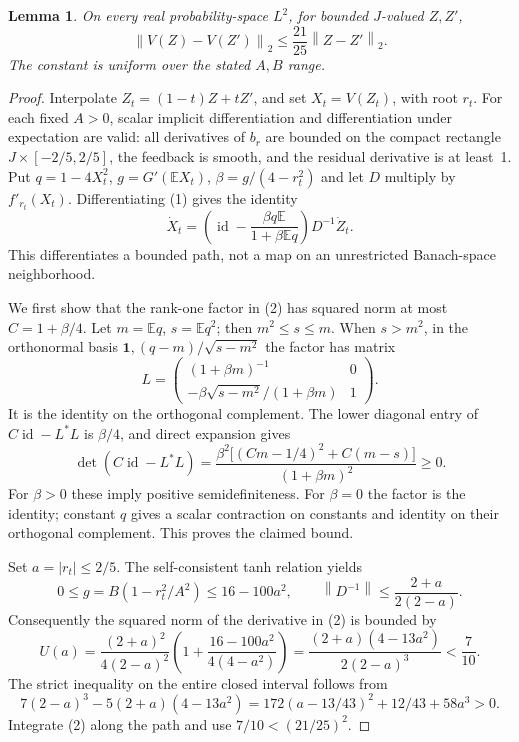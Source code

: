 \documentclass[11pt]{article}
\newtheorem{lemma}[theorem]{Lemma}
\newcommand{\E}{\mathbb E}
\newcommand{\norm}[1]{\left\lVert#1\right\rVert}
\newcommand{\one}{\mathbf 1}
\DeclareMathOperator{\id}{id}
\begin{document}
\begin{lemma}\label{lem:contract}
On every real probability-space $L^2$, for bounded $J$-valued $Z,Z'$,
\[
 \norm{V(Z)-V(Z')}_2\le\frac{21}{25}\norm{Z-Z'}_2.
\]
The constant is uniform over the stated $A,B$ range.
\end{lemma}
\begin{proof}
Interpolate $Z_t=(1-t)Z+tZ'$, and set $X_t=V(Z_t)$, with root $r_t$.
For each fixed $A>0$, scalar implicit differentiation and differentiation
under expectation are valid: all derivatives of $b_r$ are bounded on the
compact rectangle $J\times[-2/5,2/5]$, the feedback is smooth, and the residual
derivative is at least~1. Put $q=1-4X_t^2$, $g=G'(\E X_t)$,
$\beta=g/(4-r_t^2)$ and let $D$ multiply by $f'_{r_t}(X_t)$. Differentiating
(1) gives the identity
\[
 \dot X_t=\left(\id-\frac{\beta q\E}{1+\beta\E q}\right)D^{-1}\dot Z_t.
                                                               \tag{2}
\]
This differentiates a bounded path, not a map on an unrestricted Banach-space
neighborhood.

We first show that the rank-one factor in (2) has squared norm at most
$C=1+\beta/4$. Let $m=\E q$, $s=\E q^2$; then $m^2\le s\le m$.
When $s>m^2$, in the orthonormal basis $\one,(q-m)/\sqrt{s-m^2}$ the factor
has matrix
\[
 L=\begin{pmatrix}(1+\beta m)^{-1}&0\\
 -\beta\sqrt{s-m^2}/(1+\beta m)&1\end{pmatrix}.
\]
It is the identity on the orthogonal complement. The lower diagonal entry
of $C\id-L^*L$ is $\beta/4$, and direct expansion gives
\[
 \det(C\id-L^*L)=
 \frac{\beta^2\bigl[(Cm-1/4)^2+C(m-s)\bigr]}{(1+\beta m)^2}\ge0.
\]
For $\beta>0$ these imply positive semidefiniteness. For $\beta=0$ the factor
is the identity; constant $q$ gives a scalar contraction on constants and
identity on their orthogonal complement. This proves the claimed bound.

Set $a=|r_t|\le2/5$. The self-consistent tanh relation yields
\[
 0\le g=B(1-r_t^2/A^2)\le16-100a^2,\qquad
 \norm{D^{-1}}\le\frac{2+a}{2(2-a)}.
\]
Consequently the squared norm of the derivative in (2) is bounded by
\[
 U(a)=\frac{(2+a)^2}{4(2-a)^2}
       \left(1+\frac{16-100a^2}{4(4-a^2)}\right)
     =\frac{(2+a)(4-13a^2)}{2(2-a)^3}<\frac7{10}.
\]
The strict inequality on the entire closed interval follows from
\[
 7(2-a)^3-5(2+a)(4-13a^2)
   =172(a-13/43)^2+12/43+58a^3>0.
\]
Integrate (2) along the path and use $7/10<(21/25)^2$.
\end{proof}
\end{document}
